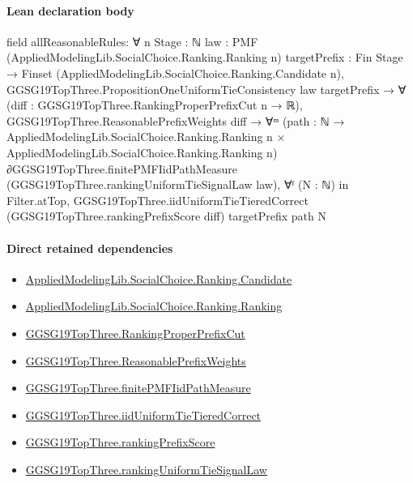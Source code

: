 \documentclass[10pt]{article}
\begin{document}
\paragraph{Lean declaration body}
\begin{ReviewVerbatim}
field allReasonableRules:
∀ {n Stage : ℕ} {law : PMF (AppliedModelingLib.SocialChoice.Ranking.Ranking n)}
  {targetPrefix : Fin Stage → Finset (AppliedModelingLib.SocialChoice.Ranking.Candidate n)},
  GGSG19TopThree.PropositionOneUniformTieConsistency law targetPrefix →
    ∀ (diff : GGSG19TopThree.RankingProperPrefixCut n → ℝ),
      GGSG19TopThree.ReasonablePrefixWeights diff →
        ∀ᵐ (path :
          ℕ →
            AppliedModelingLib.SocialChoice.Ranking.Ranking n ×
              AppliedModelingLib.SocialChoice.Ranking.Ranking
                n) ∂GGSG19TopThree.finitePMFIidPathMeasure (GGSG19TopThree.rankingUniformTieSignalLaw law),
          ∀ᶠ (N : ℕ) in Filter.atTop,
            GGSG19TopThree.iidUniformTieTieredCorrect (GGSG19TopThree.rankingPrefixScore diff) targetPrefix path N
\end{ReviewVerbatim}

\paragraph{Direct retained dependencies}
\begin{itemize}\raggedright
\item \hyperlink{governing-declaration-8c0e6c25845ae78a}{Applied\allowbreak{}Modeling\allowbreak{}Lib.\allowbreak{}Social\allowbreak{}Choice.\allowbreak{}Ranking.\allowbreak{}Candidate}
\item \hyperlink{governing-declaration-5cde54446d1ae021}{Applied\allowbreak{}Modeling\allowbreak{}Lib.\allowbreak{}Social\allowbreak{}Choice.\allowbreak{}Ranking.\allowbreak{}Ranking}
\item \hyperlink{governing-declaration-22eb6cc53fca60ee}{GGSG19\allowbreak{}Top\allowbreak{}Three.\allowbreak{}Ranking\allowbreak{}Proper\allowbreak{}Prefix\allowbreak{}Cut}
\item \hyperlink{paper-prerequisite-eb089112dcbf93d9}{GGSG19\allowbreak{}Top\allowbreak{}Three.\allowbreak{}Reasonable\allowbreak{}Prefix\allowbreak{}Weights}
\item \hyperlink{governing-declaration-abcb140d4995d792}{GGSG19\allowbreak{}Top\allowbreak{}Three.\allowbreak{}finite\allowbreak{}PMF\allowbreak{}Iid\allowbreak{}Path\allowbreak{}Measure}
\item \hyperlink{paper-prerequisite-0e1a32dc76fa50be}{GGSG19\allowbreak{}Top\allowbreak{}Three.\allowbreak{}iid\allowbreak{}Uniform\allowbreak{}Tie\allowbreak{}Tiered\allowbreak{}Correct}
\item \hyperlink{paper-prerequisite-de0bf2a40489a6d5}{GGSG19\allowbreak{}Top\allowbreak{}Three.\allowbreak{}ranking\allowbreak{}Prefix\allowbreak{}Score}
\item \hyperlink{paper-prerequisite-61b6736a43b1819d}{GGSG19\allowbreak{}Top\allowbreak{}Three.\allowbreak{}ranking\allowbreak{}Uniform\allowbreak{}Tie\allowbreak{}Signal\allowbreak{}Law}
\end{itemize}
\hypertarget{governing-declaration-bbe25196a9ddcb6f}{}
\end{document}
